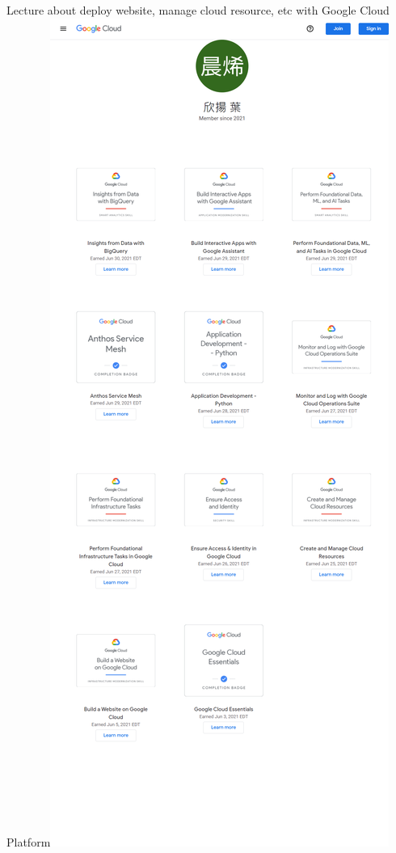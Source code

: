 \begin{cventries}
  \cventry
    {Lecture about deploy website, manage cloud resource, etc with Google Cloud Platform\linebreak[1]\includegraphics[scale=0.3, left]{gcp.png}}
    {\href{https://www.cloudskillsboost.google/public_profiles/1bfb275d-a0a0-4fa0-9c5c-3aa34a697132}{\color{hyperlink}{Google Cloud Jam 2021(link)}}}
    {}{}{}


\end{cventries}
